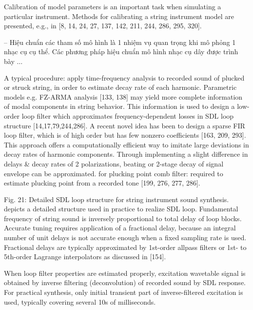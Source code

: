 \documentclass{article}
\begin{document}
\begin{itemize}
\begin{itemize}
		Calibration of model parameters is an important task when simulating a particular instrument. Methods for calibrating a string instrument model are presented, e.g., in [8, 14, 24, 27, 137, 142, 211, 244, 286, 295, 320].
		
		-- Hiệu chuẩn các tham số mô hình là 1 nhiệm vụ quan trọng khi mô phỏng 1 nhạc cụ cụ thể. Các phương pháp hiệu chuẩn mô hình nhạc cụ dây được trình bày $\ldots$
		
		A typical procedure: apply time-frequency analysis to recorded sound of plucked or struck string, in order to estimate decay rate of each harmonic. Parametric models e.g. FZ-ARMA analysis [133, 138] may yield more complete information of modal components in string behavior. This information is used to design a low-order loop filter which approximates frequency-dependent losses in SDL loop structure [14,17,79,244,286]. A recent novel idea has been to design a sparse FIR loop filter, which is of high order but has few nonzero coefficients [163, 209, 293]. This approach offers a computationally efficient way to imitate large deviations in decay rates of harmonic components. Through implementing a slight difference in delays \& decay rates of 2 polarizations, beating or 2-stage decay of signal envelope can be approximated. for plucking point comb filter: required to estimate plucking point from a recorded tone [199, 276, 277, 286].
		
		{\sf Fig. 21: Detailed SDL loop structure for string instrument sound synthesis.} depicts a detailed structure used in practice to realize SDL loop. Fundamental frequency of string sound is inversely proportional to total delay of loop blocks. Accurate tuning requires application of a fractional delay, because an integral number of unit delays is not accurate enough when a fixed sampling rate is used. Fractional delays are typically approximated by 1st-order allpass filters or 1st- to 5th-order Lagrange interpolators as discussed in [154].
		
		When loop filter properties are estimated properly, excitation wavetable signal is obtained by inverse filtering (deconvolution) of recorded sound by SDL response. For practical synthesis, only initial transient part of inverse-filtered excitation is used, typically covering several 10s of milliseconds.
		

\end{itemize}
\end{itemize}
\end{document}
